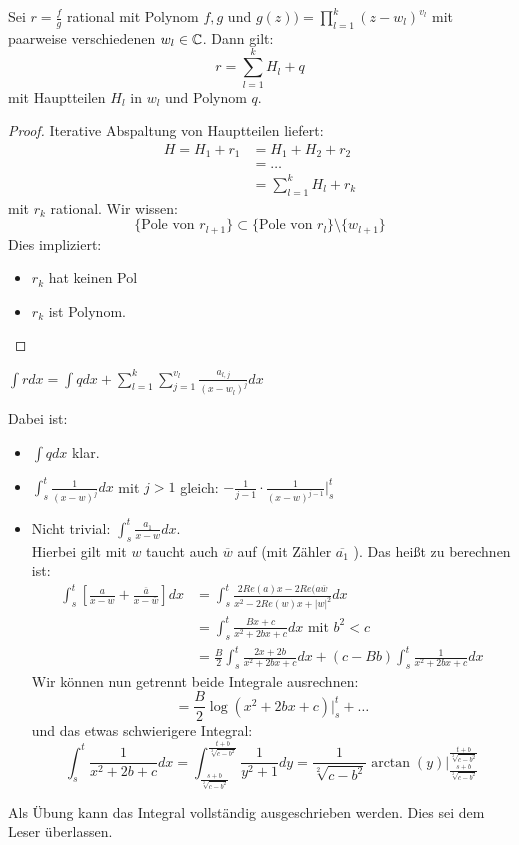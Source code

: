 \begin{theorem}
	Sei $r=\frac{f}{g}$ rational mit Polynom $f,g$ und $g(z))= \prod_{l=1}^{k} (z-w_l)^{v_l} $ mit paarweise verschiedenen $w_l \in \mathbb{C}$. Dann gilt:
	\[
	r= \sum_{l=1}^{k}H_l +q
	\]
mit Hauptteilen $H_l$ in $w_l$ und Polynom $q$.   

\end{theorem}
\begin{proof}
Iterative Abspaltung von Hauptteilen liefert:
\begin{align*}
	H = H_1+r_1 &= H_1+H_2+r_{2} \\
	 &= \ldots \\
	 &= \sum_{l=1}^{k}H_l +r_k
\end{align*}
mit $r_k$ rational. Wir wissen:
\[
	\{\text{Pole von } r_{l+1}\} \subset \{\text{Pole von }r_l\} \setminus \{w_{l+1}\} 
\]
Dies impliziert:
\begin{itemize}
	\item $r_k$ hat keinen Pol
	\item $r_k$ ist Polynom.
\end{itemize}
\end{proof}
\begin{corollary}
	$\int r dx = \int q dx + \sum_{l=1}^{k}\sum_{j=1}^{v_l}\frac{a_{l,j}}{(x-w_l)^j}dx$ 
\end{corollary}
Dabei ist:
\begin{itemize}
	\item $\int q dx$ klar. 
	\item $\int_{s}^{t} \frac{1}{(x-w)^j}dx$ mit $j>1$ gleich: $ -\frac{1}{j-1}\cdot \frac{1}{(x-w)^{j-1}}\big|_{s}^{t}$  
	\item Nicht trivial: $\int_s^t \frac{a_1}{x-w}dx$. \\
		Hierbei gilt mit $w$ taucht auch $\overline{w}$ auf (mit Zähler $\overline{a_1}$ ). Das heißt zu berechnen ist:
\begin{align*}
	\int_s^t \left[ \frac{a}{x-w}+ \frac{\overline{a}}{x-\overline{w}}\right] dx 
	&= \int_s^t \frac{2Re(a)x-2Re(a\overline{w}}{x^2 - 2Re(w)x+|w|^2}dx \\
	&= \int_s^t \frac{Bx+c}{x^2+2bx+c}dx \text{ mit } b^2 <c \\
	&= \frac{B}{2}\int_s^t \frac{2x+2b}{x^2+2bx+c}dx + (c-Bb) \int_s^t \frac{1}{x^2+2bx+c}dx 
\end{align*}
Wir können nun getrennt beide Integrale ausrechnen:
\[
= \frac{B}{2}\log(x^2+2bx+c)\big|_s^t + \ldots
\]
und das etwas schwierigere Integral:
\[
	\int_s^t \frac{1}{x^2+2b+c}dx= \int_{\frac{s+b}{\sqrt[2]{c-b^2}}}^{\frac{t+b}{\sqrt[2]{c-b^2} }} \frac{1}{y^2+1}dy = \frac{1}{\sqrt[2]{c-b^2}} \arctan(y) \big|_{\frac{s+b}{\sqrt[2]{c-b^2} }}^{\frac{t+b}{\sqrt[2]{c-b^2} }}
\]
\end{itemize}
Als Übung kann das Integral vollständig ausgeschrieben werden. Dies sei dem Leser überlassen.
